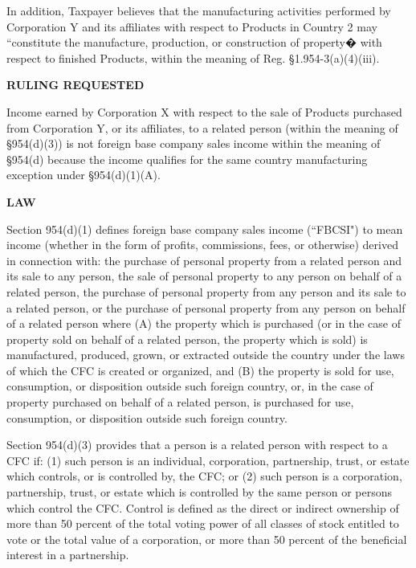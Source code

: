 \begin{select}
In addition, Taxpayer believes that the manufacturing activities performed by Corporation Y and its affiliates with respect to Products in Country 2 may ``constitute the manufacture, production, or construction of property� with respect to finished Products, within the meaning of  Reg. \S1.954-3(a)(4)(iii).


\begin{center} \textbf{RULING REQUESTED}
\end{center}


Income earned by Corporation X with respect to the sale of Products purchased from Corporation Y, or its affiliates, to a related person (within the meaning of \S954(d)(3)) is not foreign base company sales income within the meaning of \S954(d) because the income qualifies for the same country manufacturing exception under \S954(d)(1)(A).

\begin{center} \textbf{LAW}
\end{center}

Section 954(d)(1) defines foreign base company sales income (``FBCSI") to mean income (whether in the form of profits, commissions, fees, or otherwise) derived in connection with: the purchase of personal property from a related person and its sale to any person, the sale of personal property to any person on behalf of a related person, the purchase of personal property from any person and its sale to a related person, or the purchase of personal property from any person on behalf of a related person where (A) the property which is purchased (or in the case of property sold on behalf of a related person, the property which is sold) is manufactured, produced, grown, or extracted outside the country under the laws of which the CFC is created or organized, and (B) the property is sold for use, consumption, or disposition outside such foreign country, or, in the case of property purchased on behalf of a related person, is purchased for use, consumption, or disposition outside such foreign country.

Section 954(d)(3) provides that a person is a related person with respect to a CFC if: (1) such person is an individual, corporation, partnership, trust, or estate which controls, or is controlled by, the CFC; or (2) such person is a corporation, partnership, trust, or estate which is controlled by the same person or persons which control the CFC. Control is defined as the direct or indirect ownership of more than 50 percent of the total voting power of all classes of stock entitled to vote or the total value of a corporation, or more than 50 percent of the beneficial interest in a partnership.


\end{select}
